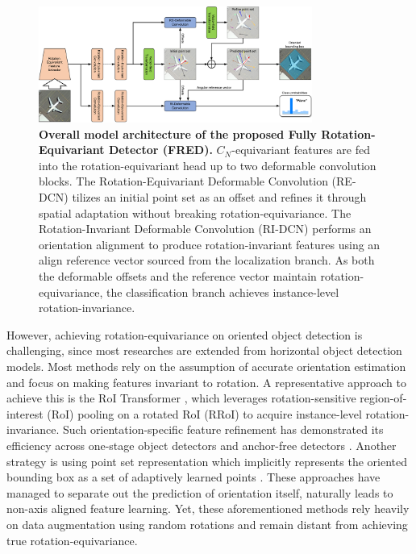 \documentclass[letterpaper]{article} %
\begin{document}
\begin{figure}[t]
\centering
\includegraphics[width=0.8\textwidth]{figs/Figure3-v3.pdf} 
\caption{\textbf{Overall model architecture of the proposed Fully Rotation-Equivariant Detector (FRED).} \( C_N \)-equivariant features are fed into the rotation-equivariant head up to two deformable convolution blocks. The Rotation-Equivariant Deformable Convolution (RE-DCN) tilizes an initial point set as an offset and refines it through spatial adaptation without breaking rotation-equivariance. The Rotation-Invariant Deformable Convolution (RI-DCN) performs an orientation alignment to produce rotation-invariant features using an align reference vector sourced from the localization branch. As both the deformable offsets and the reference vector maintain rotation-equivariance, the classification branch achieves instance-level rotation-invariance.}
\label{fig:figure2}
\end{figure}
However, achieving rotation-equivariance on oriented object detection is challenging, since most researches are extended from horizontal object detection models. Most methods rely on the assumption of accurate orientation estimation and focus on making features invariant to rotation. A representative approach to achieve this is the RoI Transformer \citep{roitransformer}, which leverages rotation-sensitive region-of-interest (RoI) pooling on a rotated RoI (RRoI) to acquire instance-level rotation-invariance. Such orientation-specific feature refinement has demonstrated its efficiency across one-stage object detectors \citep{han2021s2anet} and anchor-free detectors \citep{pan2020drn}. Another strategy is using point set representation which implicitly represents the oriented bounding box as a set of adaptively learned points \citep{guo2021beyond, li2022oriented}. These approaches have managed to separate out the prediction of orientation itself, naturally leads to non-axis aligned feature learning. Yet, these aforementioned methods rely heavily on data augmentation using random rotations and remain distant from achieving true rotation-equivariance.
\end{document}
